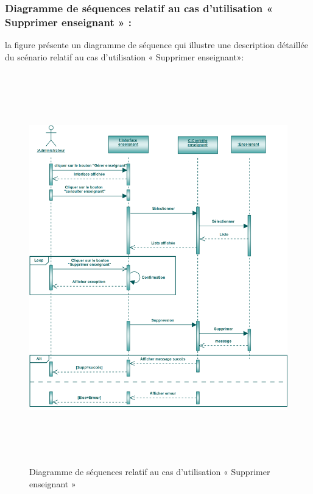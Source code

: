 \documentclass[12 pt]{report}
\begin{document}
\subsubsection{Diagramme de séquences relatif au cas d’utilisation « Supprimer enseignant » :}
la figure   présente un diagramme de séquence qui illustre une description détaillée du scénario relatif au cas d’utilisation «  Supprimer enseignant»: 
{\begin{figure}[h]
 \begin{center}
\includegraphics[width= 18cm ,height=  17cm]{sec_sup_ens.PNG}
\caption{Diagramme de séquences relatif au cas d’utilisation « Supprimer enseignant »}

\end{center}
\end{figure}}
\newpage
\end{document}
